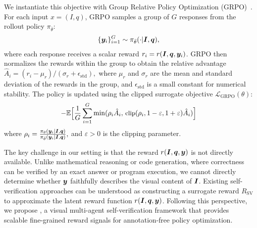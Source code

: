 We instantiate this objective with Group Relative Policy Optimization
(GRPO)~\cite{shao2024deepseekmath}. For each input $x=(I,q)$, GRPO samples a
group of $G$ responses from the rollout policy $\pi_{\bar{\theta}}$:
\begin{equation*}
    \{{\bm{y}}_i\}_{i=1}^{G}
    \sim
    \pi_{\bar{\theta}}(\cdot | {\bm{I}},{\bm{q}}),
\end{equation*}
where each response receives a scalar reward $r_i=r({\bm{I}},{\bm{q}},{\bm{y}}_i)$. GRPO then normalizes
the rewards within the group to obtain the relative advantage $\hat{A}_i={(r_i-\mu_r)}/{(\sigma_r+\epsilon_{\text{std}})},$
where $\mu_r$ and $\sigma_r$ are the mean and standard deviation of the rewards in the group, and $\epsilon_{\text{std}}$ is a small constant for numerical stability.
The policy is updated using the clipped surrogate objective
$\mathcal{L}_{\text{GRPO}}(\theta)$:
\begin{equation}
\small
-\mathbb{E}
\Big[
\frac{1}{G}
\sum_{i=1}^{G}
\min
(
\rho_i \hat{A}_i,\,
\text{clip}(\rho_i,1-\varepsilon,1+\varepsilon)\hat{A}_i
)
\Big]
\end{equation}
where $\rho_i = \frac{\pi_\theta({\bm{y}}_i| {\bm{I}},{\bm{q}})}{\pi_{\bar{\theta}}({\bm{y}}_i| {\bm{I}},{\bm{q}})},$
and $\varepsilon > 0$ is the clipping parameter.

The key challenge in our setting is that the reward $r({\bm{I}},{\bm{q}},{\bm{y}})$ is not directly available.
Unlike mathematical reasoning or code generation, where correctness can be verified by an exact answer or program execution, we cannot directly determine whether ${\bm{y}}$ faithfully describes the visual content of ${\bm{I}}$.
Existing self-verification approaches can be understood as constructing a surrogate reward $R_{\text{SV}}$ to approximate the latent reward function $r({\bm{I}},{\bm{q}},{\bm{y}})$. 
Following this perspective, we propose \ours, a visual multi-agent self-verification framework that provides scalable fine-grained reward signals for annotation-free policy optimization.
